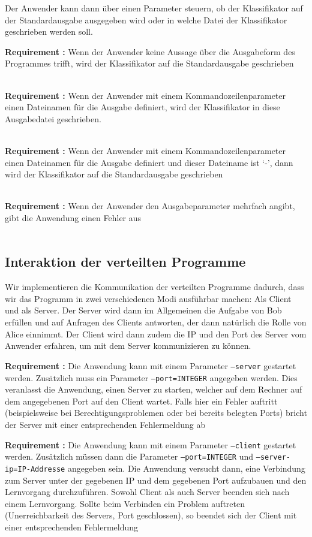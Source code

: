 \documentclass{article}
\newcounter{requirementscount}{}
\newcommand{\requirement}[1] {
        \addtocounter{requirementscount}{1}
        {\bf Requirement \therequirementscount:} #1\\
    }
\begin{document}
Der Anwender kann dann \"uber einen Parameter steuern, ob der Klassifikator
auf der Standardausgabe ausgegeben wird oder in welche Datei der Klassifikator
geschrieben werden soll.\\
\requirement{Wenn der Anwender keine Aussage \"uber die Ausgabeform des
Programmes trifft, wird der Klassifikator auf die Standardausgabe geschrieben}\\
\requirement{Wenn der Anwender mit einem Kommandozeilenparameter einen
Dateinamen f\"ur die Ausgabe definiert, wird der Klassifikator in diese
Ausgabedatei geschrieben.}\\
\requirement{Wenn der Anwender mit einem Kommandozeilenparameter
einen Dateinamen f\"ur die Ausgabe definiert und dieser Dateiname
ist `-', dann wird der Klassifikator auf die Standardausgabe 
geschrieben}\\
\requirement{Wenn der Anwender den Ausgabeparameter mehrfach angibt,
gibt die Anwendung einen Fehler aus}\\

\subsection{Interaktion der verteilten Programme}
Wir implementieren die Kommunikation der verteilten Programme dadurch, dass
wir das Programm in zwei verschiedenen Modi ausf\"uhrbar machen: Als Client
und als Server. Der Server wird dann im Allgemeinen die Aufgabe von Bob 
erf\"ullen und auf Anfragen des Clients antworten, der dann nat\"urlich die
Rolle von Alice einnimmt. Der Client wird dann zudem die IP und den Port
des Server vom Anwender erfahren, um mit dem Server kommunizieren zu k\"onnen.\\
\requirement{Die Anwendung kann mit einem Parameter \texttt{--server} gestartet
werden. Zus\"atzlich muss ein Parameter \texttt{--port=INTEGER} angegeben werden.
Dies veranlasst die Anwendung, einen Server zu starten, welcher auf dem
Rechner auf dem angegebenen Port auf den Client wartet. Falls hier ein
Fehler auftritt (beispielsweise bei Berechtigungsproblemen oder bei
bereits belegten Ports) bricht der Server mit einer entsprechenden Fehlermeldung
ab}
\requirement{Die Anwendung kann mit einem Parameter \texttt{--client} gestartet
werden. Zus\"atzlich m\"ussen dann die Parameter \texttt{--port=INTEGER}
und \texttt{--server-ip=IP-Addresse} angegeben sein. Die Anwendung versucht
dann, eine Verbindung zum Server unter der gegebenen IP und dem gegebenen
Port aufzubauen und den Lernvorgang durchzuf\"uhren. Sowohl Client als
auch Server beenden sich nach einem Lernvorgang. Sollte beim Verbinden
ein Problem auftreten (Unerreichbarkeit des Servers, Port geschlossen),
so beendet sich der Client mit einer entsprechenden Fehlermeldung}\\
\end{document}
